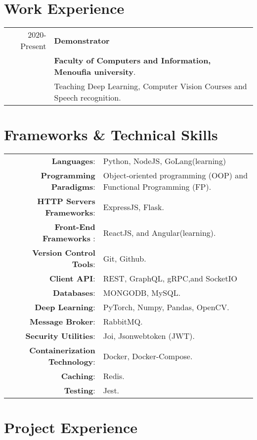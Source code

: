 \documentclass[a4paper,10pt]{article} %
\begin{document}
\section{\textbf{Work Experience}}

\begin{tabular}{r|l}
2020-Present  & \textbf{Demonstrator} \\&\textbf{Faculty of Computers and Information, Menoufia university}.\\& Teaching Deep Learning, Computer Vision Courses and Speech recognition.
\\
\end{tabular}

\section{\textbf{Frameworks \& Technical Skills}}

\begin{tabular}{rl}	
    \textbf{Languages}:& Python, NodeJS, GoLang(learning)\\
    \textbf{Programming Paradigms}:&  Object-oriented programming (OOP) and Functional Programming (FP).\\
    \textbf{HTTP Servers Frameworks}:& ExpressJS, Flask.\\
    \textbf{Front-End Frameworks} :& ReactJS, and Angular(learning).\\
    \textbf{Version Control Tools}:& Git, Github.\\
    \textbf{Client API}:& REST, GraphQL, gRPC,and SocketIO\\
    \textbf{Databases}:& MONGODB, MySQL.\\
    \textbf{Deep Learning}:& PyTorch, Numpy, Pandas, OpenCV.\\
    \textbf{Message Broker}:& RabbitMQ.\\
    \textbf{Security Utilities}:& Joi, Jsonwebtoken (JWT).\\ 
    \textbf{Containerization Technology}:& Docker, Docker-Compose.\\
    \textbf{Caching}:& Redis.\\
    \textbf{Testing}:& Jest.\\ 
\end{tabular}

 
\section{\textbf{Project Experience}}  
\end{document}
